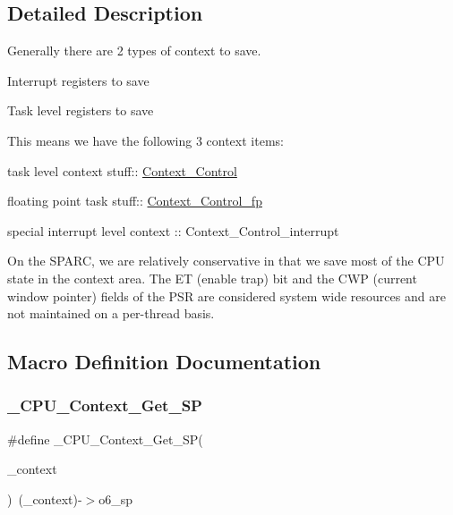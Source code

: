 \subsection{Detailed Description}
Generally there are 2 types of context to save.
\begin{DoxyItemize}
\item Interrupt registers to save
\item Task level registers to save
\end{DoxyItemize}

This means we have the following 3 context items\+:
\begin{DoxyItemize}
\item task level context stuff\+:\+: \mbox{\hyperlink{structContext__Control}{Context\+\_\+\+Control}}
\item floating point task stuff\+:\+: \mbox{\hyperlink{structContext__Control__fp}{Context\+\_\+\+Control\+\_\+fp}}
\item special interrupt level context \+:: Context\+\_\+\+Control\+\_\+interrupt
\end{DoxyItemize}

On the S\+P\+A\+RC, we are relatively conservative in that we save most of the C\+PU state in the context area. The ET (enable trap) bit and the C\+WP (current window pointer) fields of the P\+SR are considered system wide resources and are not maintained on a per-\/thread basis. 

\subsection{Macro Definition Documentation}
\mbox{\label{group__RTEMSScoreCPUSPARCContext_ga896055157b72692a6141f7c0039eabdf}} 
\subsubsection{\texorpdfstring{\_CPU\_Context\_Get\_SP}{\_CPU\_Context\_Get\_SP}}
{\footnotesize\ttfamily \#define \+\_\+\+C\+P\+U\+\_\+\+Context\+\_\+\+Get\+\_\+\+SP(\begin{DoxyParamCaption}\item[{}]{\+\_\+context }\end{DoxyParamCaption})~(\+\_\+context)-\/$>$o6\+\_\+sp}

